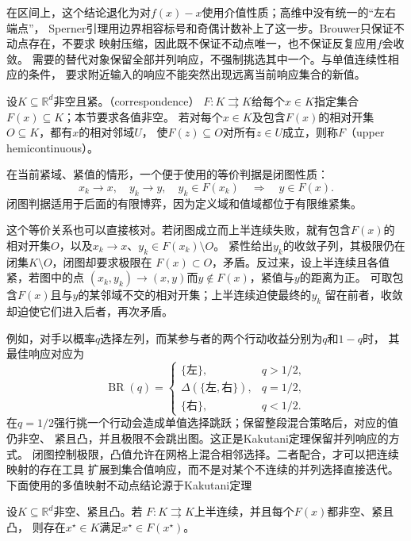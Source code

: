 在区间上，这个结论退化为对\(f(x)-x\)使用介值性质；高维中没有统一的“左右端点”，
Sperner引理用边界相容标号和奇偶计数补上了这一步。Brouwer只保证不动点存在，不要求
映射压缩，因此既不保证不动点唯一，也不保证反复应用\(f\)会收敛。
需要的替代对象保留全部并列响应，不强制挑选其中一个。与单值连续性相应的条件，
要求附近输入的响应不能突然出现远离当前响应集合的新值。
\begin{definition}[集合值映射与上半连续性]
\label{def:game-upper-hemicontinuous-correspondence}
设$K\subseteq\mathbb R^d$非空且紧。（correspondence）
\(F:K\rightrightarrows K\)给每个$x\in K$指定集合$F(x)\subseteq K$；本节要求各值非空。
若对每个$x\in K$及包含$F(x)$的相对开集$O\subseteq K$，都有$x$的相对邻域$U$，
使$F(z)\subseteq O$对所有$z\in U$成立，则称$F$（upper hemicontinuous）。
\end{definition}
在当前紧域、紧值的情形，一个便于使用的等价判据是闭图性质：
\[
  x_k\to x,\quad y_k\to y,\quad y_k\in F(x_k)
  \quad\Longrightarrow\quad
  y\in F(x).
\]
闭图判据适用于后面的有限博弈，因为定义域和值域都位于有限维紧集。

这个等价关系也可以直接核对。若闭图成立而上半连续失败，就有包含\(F(x)\)的
相对开集\(O\)，以及\(x_k\to x\)、\(y_k\in F(x_k)\setminus O\)。
紧性给出\(y_k\)的收敛子列，其极限仍在闭集\(K\setminus O\)，闭图却要求极限在
\(F(x)\subset O\)，矛盾。反过来，设上半连续且各值紧，若图中的点
\((x_k,y_k)\to(x,y)\)而\(y\notin F(x)\)，紧值与\(y\)的距离为正。
可取包含\(F(x)\)且与\(y\)的某邻域不交的相对开集；上半连续迫使最终的\(y_k\)
留在前者，收敛却迫使它们进入后者，再次矛盾。

例如，对手以概率\(q\)选择左列，而某参与者的两个行动收益分别为\(q\)和\(1-q\)时，
其最佳响应对应为
\[
  \operatorname{BR}(q)
  =
  \begin{cases}
    \{\text{左}\},&q>1/2,\\
    \Delta(\{\text{左},\text{右}\}),&q=1/2,\\
    \{\text{右}\},&q<1/2.
  \end{cases}
\]
在\(q=1/2\)强行挑一个行动会造成单值选择跳跃；保留整段混合策略后，对应的值仍非空、
紧且凸，并且极限不会跳出图。这正是Kakutani定理保留并列响应的方式。
闭图控制极限，凸值允许在网格上混合相邻选择。二者配合，才可以把连续映射的存在工具
扩展到集合值响应，而不是对某个不连续的并列选择直接迭代。
下面使用的多值映射不动点结论源于Kakutani定理
\begin{theorem}[Kakutani不动点定理]
\label{thm:game-kakutani}
设\(K\subseteq\mathbb{R}^d\)非空、紧且凸。若
\(F:K\rightrightarrows K\)上半连续，并且每个\(F(x)\)都非空、紧且凸，
则存在\(x^\star\in K\)满足\(x^\star\in F(x^\star)\)。
\end{theorem}

